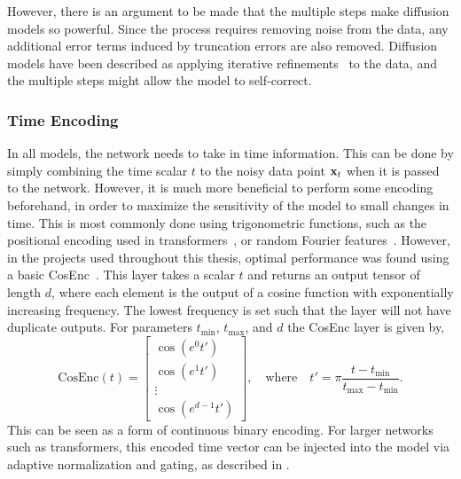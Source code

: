 However, there is an argument to be made that the multiple steps make diffusion models so powerful.
Since the process requires removing noise from the data, any additional error terms induced by truncation errors are also removed.
Diffusion models have been described as applying iterative refinements~\cite{ImageSuperResolutionIterative} to the data, and the multiple steps might allow the model to self-correct.

\subsubsection{Time Encoding}
\label{sec:time_encoding}

In all models, the network needs to take in time information.
This can be done by simply combining the time scalar $t$ to the noisy data point $\mathbf{x}_t$ when it is passed to the network.
However, it is much more beneficial to perform some encoding beforehand, in order to maximize the sensitivity of the model to small changes in time.
This is most commonly done using trigonometric functions, such as the positional encoding used in transformers~\cite{Attention}, or random Fourier features~\cite{FourierFeaturesLet}.
However, in the projects used throughout this thesis, optimal performance was found using a basic \Gls{CosEnc}~\cite{ImplicitQuantileNetworks}.
This layer takes a scalar $t$ and returns an output tensor of length $d$, where each element is the output of a cosine function with exponentially increasing frequency.
The lowest frequency is set such that the layer will not have duplicate outputs.
For parameters $t_\text{min}$, $t_\text{max}$, and $d$ the \Gls{CosEnc} layer is given by,
\begin{equation}
    \label{eq:cosine_encoding}
    \text{CosEnc}(t) =
    \begin{bmatrix}
        \cos\left(e^0 t'\right) \\
        \cos\left(e^1 t'\right) \\
        \vdots                  \\
        \cos\left(e^{d-1} t'\right)
    \end{bmatrix}, \quad \text{where} \quad t' = \pi \frac{t - t_\text{min}}{t_\text{max} - t_\text{min}}.
\end{equation}
This can be seen as a form of continuous binary encoding.
For larger networks such as transformers, this encoded time vector can be injected into the model via adaptive normalization and gating, as described in .

